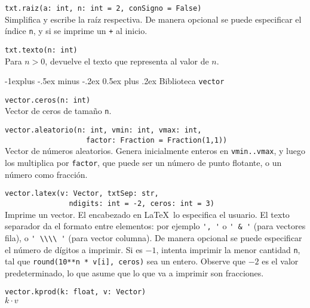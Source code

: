 \documentclass[10pt,landscape]{article}
\makeatletter
\renewcommand{\subsection}{\@startsection{subsection}{2}{0mm}%
                                {-1explus -.5ex minus -.2ex}%
                                {0.5ex plus .2ex}%
                                {\normalfont\normalsize\bfseries}}
\makeatother
\begin{document}
\begin{multicols}{3}
\begin{asparaitem}
\item  \verb|txt.raiz(a: int, n: int = 2, conSigno = False)| \\
\quad Simplifica y escribe la raíz respectiva. De manera opcional se puede especificar el \'indice \verb|n|, y si se imprime un \verb|+| al inicio.

\item \verb|txt.texto(n: int)| \\
\quad Para $n > 0$, devuelve el texto que representa al valor de $n$.
\end{asparaitem}

\subsection{Biblioteca \texttt{vector}}
\begin{asparaitem}
\item \verb|vector.ceros(n: int)| \\
\quad Vector de ceros de tamaño \verb|n|. 

\item \verb|vector.aleatorio(n: int, vmin: int, vmax: int,| \\
  \verb|                   factor: Fraction = Fraction(1,1))| \\
  \quad Vector de números aleatorios. Genera inicialmente enteros en \verb|vmin..vmax|, y luego los multiplica por \verb|factor|, que puede ser un n\'umero de punto flotante, o un n\'umero como fracci\'on.

\item \verb|vector.latex(v: Vector, txtSep: str,| \\
      \verb|               ndigits: int = -2, ceros: int = 3)| \\
  \quad Imprime un vector. El encabezado en \LaTeX\ lo especifica el usuario. El texto separador da el formato entre elementos: por ejemplo \verb|', '| o \verb|' & '| (para vectores fila), o \verb|' \\\\ '| (para vector columna). De manera opcional se puede especificar el n\'umero de d\'igitos a imprimir. Si es $-1$, intenta imprimir la menor cantidad \verb|n|, tal que \verb|round(10**n * v[i], ceros)| sea un entero. Observe que $-2$ es el valor predeterminado, lo que asume que lo que va a imprimir son fracciones.

\item \verb|vector.kprod(k: float, v: Vector)| \\
\quad $k\cdot v$


\end{asparaitem}
\end{multicols}
\end{document}
